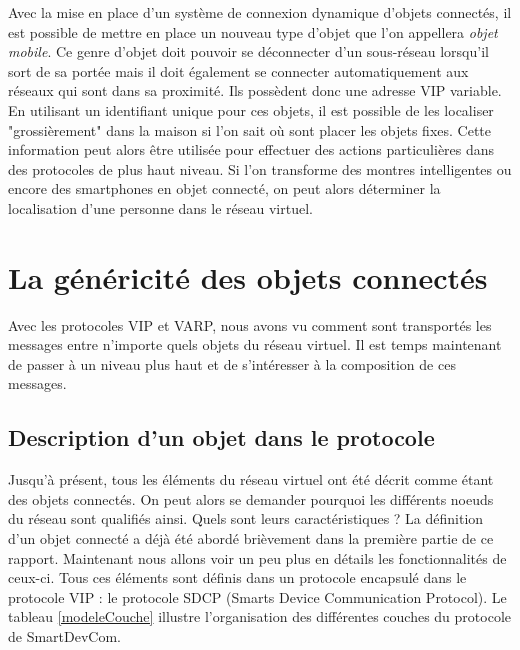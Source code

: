 		Avec la mise en place d'un système de connexion dynamique d'objets connectés, il est possible
		de mettre en place un nouveau type d'objet que l'on appellera \emph{objet mobile}. Ce genre
		d'objet doit pouvoir se déconnecter d'un sous-réseau lorsqu'il sort de sa portée mais il doit 
		également se connecter automatiquement aux réseaux qui sont dans sa proximité. Ils possèdent
		donc une adresse VIP variable. En utilisant un identifiant unique pour ces objets, il est
		possible de les localiser "grossièrement" dans la maison si l'on sait où sont placer les
		objets fixes. Cette information peut alors être utilisée pour effectuer des actions
		particulières dans des protocoles de plus haut niveau. Si l'on transforme des montres 
		intelligentes ou encore des smartphones en objet connecté, on peut alors déterminer la
		localisation d'une personne dans le réseau virtuel.
	
 
\section{La généricité des objets connectés}
	Avec les protocoles VIP et VARP, nous avons vu comment sont transportés les messages entre 
	n'importe quels objets du réseau virtuel. Il est temps maintenant de passer à un niveau plus haut
	et de s'intéresser à la composition de ces messages. 
	
	\subsection{Description d'un objet dans le protocole}
		Jusqu'à présent, tous les éléments du réseau virtuel ont été décrit comme étant des objets
		connectés. On peut alors se demander pourquoi les différents noeuds du réseau sont qualifiés
		ainsi. Quels sont leurs caractéristiques ? La définition d'un objet connecté a déjà été 
		abordé brièvement dans la première partie de ce rapport. Maintenant nous allons voir un peu
		plus en détails les fonctionnalités de ceux-ci. Tous ces éléments sont définis dans 
		un protocole encapsulé dans le protocole VIP : le protocole SDCP (Smarts Device
		Communication Protocol). Le tableau \ref{modeleCouche} illustre l'organisation des différentes
		couches du protocole de SmartDevCom.
		
